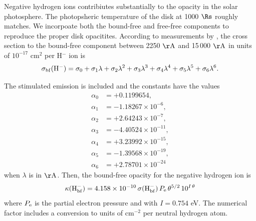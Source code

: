 Negative hydrogen ions contribiutes substantially to the opacity in the solar photosphere. The photopsheric temperature of the \citet{SirkoGoodman03} disk at 1000 $\Rs$ roughly matches. We incorpoate both the bound-free and free-free components to reproduce the proper disk opacitites. According to measurements by \citet{Wishart79}, the cross section to the bound-free component between 2250 $\rm \AA$ and 15\,000 $\rm \AA$ in units of $10^{-17}$ cm$^2$ per H$^-$ ion is
\begin{equation}
    \sigma_{\rm bf}(\rm H^-) = \sigma_0 + \sigma_1 \lambda + \sigma_2 \lambda^2 + \sigma_3 \lambda^3 + \sigma_4 \lambda^4 + \sigma_5 \lambda^5 + \sigma_6 \lambda^6.
\end{equation}

The stimulated emission is included and the constants have the values
\begin{align}
    \alpha_0 &= +0.1199654, \\
    \alpha_1 &= -1.18267 \times 10^{-6}, \\
    \alpha_2 &= +2.64243 \times 10^{-7}, \\
    \alpha_3 &= -4.40524 \times 10^{-11}, \\
    \alpha_4 &= +3.23992 \times 10^{-15}, \\
    \alpha_5 &= -1.39568 \times 10^{-19}, \\
    \alpha_6 &= +2.78701 \times 10^{-24}
\end{align}
when $\lambda$ is in $\rm \AA$. Then, the bound-free opacity for the negative hydrogen ion is
\begin{equation}
    \kappa({\rm H^-_{bf}}) = 4.158 \times 10^{-10} \, \sigma({\rm H^-_{bf}}) \, P_{\rm e} \, \theta^{5/2} \, 10^{I\, \theta} \\
\end{equation}
where $P_{\rm e}$ is the partial electron pressure and with $I = 0.754$ eV. The numerical factor includes a conversion to units of cm$^{-2}$ per neutral hydrogen atom.

